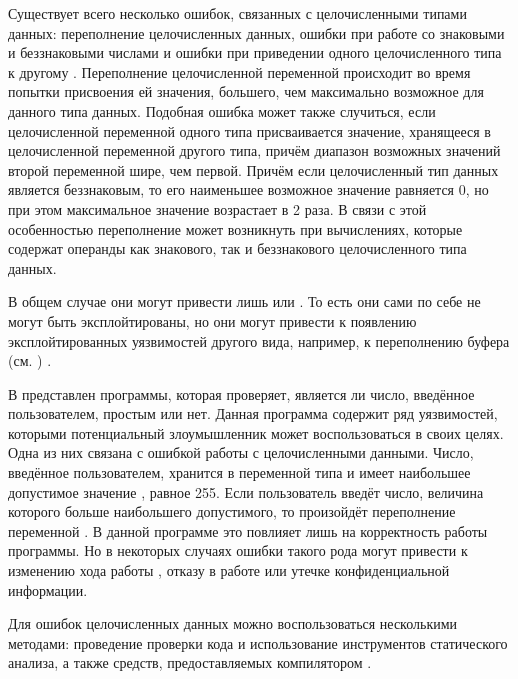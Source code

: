 %
Существует всего несколько  ошибок, связанных с целочисленными типами данных: переполнение целочисленных данных, ошибки при работе со знаковыми и беззнаковыми числами и ошибки при приведении одного целочисленного типа к другому     . 
%
Переполнение целочисленной переменной происходит во время попытки присвоения ей значения, большего, чем максимально возможное для данного типа данных. 
%
Подобная ошибка может также случиться, если целочисленной переменной одного типа присваивается значение, хранящееся в целочисленной переменной другого типа, причём диапазон возможных значений второй переменной шире, чем первой. 
%
Причём если целочисленный тип данных является беззнаковым, то его наименьшее возможное значение равняется 0, но при этом максимальное значение возрастает в 2 раза. 
%
В связи с этой особенностью переполнение может возникнуть при вычислениях, которые содержат операнды как знакового, так и беззнакового целочисленного типа данных. 

%
В общем случае они могут привести лишь  или . 
%
То есть они сами по себе не могут быть эксплойтированы, но они могут привести к появлению эксплойтированных уязвимостей другого вида, например, к переполнению буфера (см. ) . 

%
В  представлен  программы, которая проверяет, является ли число, введённое пользователем, простым или нет. 
%
Данная программа содержит ряд уязвимостей, которыми потенциальный злоумышленник может воспользоваться в своих целях. 
%
Одна из них связана с ошибкой работы с целочисленными данными.
%
Число, введённое пользователем, хранится в переменной  типа  и имеет наибольшее допустимое значение , равное 255.
%
Если пользователь введёт число, величина которого больше наибольшего допустимого, то произойдёт переполнение переменной . 
%
В данной программе это повлияет лишь на корректность работы программы. 
%
Но в некоторых случаях ошибки такого рода могут привести к изменению хода работы , отказу в работе или утечке конфиденциальной информации.

%
Для  ошибок целочисленных данных можно воспользоваться несколькими методами: проведение проверки кода и использование инструментов статического анализа, а также средств, предоставляемых компилятором  .

